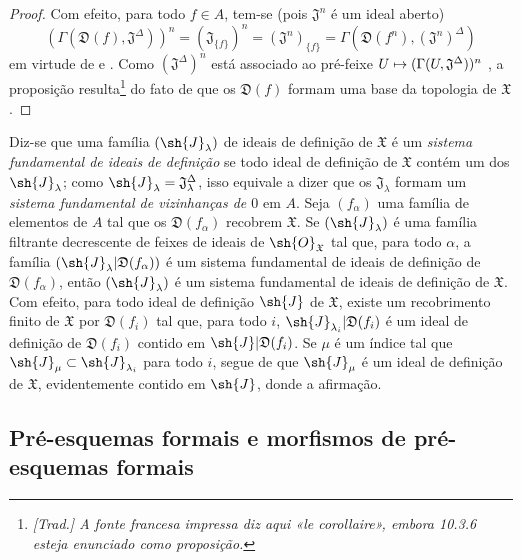 \documentclass[oneside]{amsart}
\makeatletter
\newcommand{\ega@arrow}[2]{\mathchoice{#1}{#2}{#2}{#2}}
\let\ega@shortmapsto\mapsto
\renewcommand{\mapsto}{\ega@arrow{\longmapsto}{\ega@shortmapsto}}
\newcommand{\oldpage}[2][]{{\marginnote{\normalfont\textbf{#1}~|~#2}}\ignorespaces}
\let\EGAOriginalLabel\label
\renewcommand{\label}[1]{\phantomsection\EGAOriginalLabel{#1}}
\makeatother
\begin{document}
\begin{proof}
Com efeito, para todo $f\in A$, tem-se (pois $\mathfrak{J}^n$ é um ideal aberto)
\[
  (\Gamma(\mathfrak{D}(f),\mathfrak{J}^\Delta))^n=(\mathfrak{J}_{\{f\}})^n=(\mathfrak{J}^n)_{\{f\}}=\Gamma(\mathfrak{D}(f^n),(\mathfrak{J}^n)^\Delta)
\]
\oldpage[I]{185}
em virtude de  e .
Como $(\mathfrak{J}^\Delta)^n$ está associado ao pré-feixe $U\mapsto(\Gamma(U,\mathfrak{J}^\Delta))^n$ , a proposição resulta\footnote{\emph{[Trad.] A fonte francesa impressa diz aqui «le corollaire», embora 10.3.6 esteja enunciado como proposição.}} do fato de que os $\mathfrak{D}(f)$ formam uma base da topologia de $\mathfrak{X}$.
\end{proof}

\begin{env}[10.3.7]
\label{I.10.3.7}
Diz-se que uma família $(\sh{J}_\lambda)$ de ideais de definição de $\mathfrak{X}$ é um \emph{sistema fundamental de ideais de definição} se todo ideal de definição de $\mathfrak{X}$ contém um dos $\sh{J}_\lambda$; como $\sh{J}_\lambda=\mathfrak{J}_\lambda^\Delta$, isso equivale a dizer que os $\mathfrak{J}_\lambda$ formam um \emph{sistema fundamental de vizinhanças de $0$} em $A$.
Seja $(f_\alpha)$ uma família de elementos de $A$ tal que os $\mathfrak{D}(f_\alpha)$ recobrem $\mathfrak{X}$.
Se $(\sh{J}_\lambda)$ é uma família filtrante decrescente de feixes de ideais de $\sh{O}_\mathfrak{X}$ tal que, para todo $\alpha$, a família $(\sh{J}_\lambda|\mathfrak{D}(f_\alpha))$ é um sistema fundamental de ideais de definição de $\mathfrak{D}(f_\alpha)$, então $(\sh{J}_\lambda)$ é um sistema fundamental de ideais de definição de $\mathfrak{X}$.
Com efeito, para todo ideal de definição $\sh{J}$ de $\mathfrak{X}$, existe um recobrimento finito de $\mathfrak{X}$ por $\mathfrak{D}(f_i)$ tal que, para todo $i$, $\sh{J}_{\lambda_i}|\mathfrak{D}(f_i)$ é um ideal de definição de $\mathfrak{D}(f_i)$ contido em $\sh{J}|\mathfrak{D}(f_i)$.
Se $\mu$ é um índice tal que $\sh{J}_\mu\subset\sh{J}_{\lambda_i}$ para todo $i$, segue de  que $\sh{J}_\mu$ é um ideal de definição de $\mathfrak{X}$, evidentemente contido em $\sh{J}$, donde a afirmação.
\end{env}

\subsection{Pré-esquemas formais e morfismos de pré-esquemas formais}
\label{subsection:I.10.4}
\end{document}
